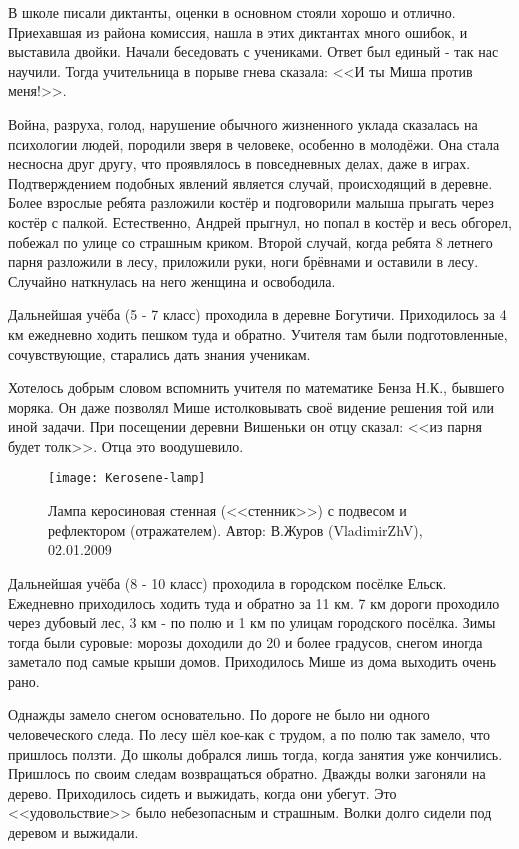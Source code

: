 В школе писали диктанты, оценки в основном стояли хорошо и отлично. Приехавшая из района комиссия, нашла в этих диктантах много ошибок, и выставила двойки. Начали беседовать с учениками. Ответ был единый - так нас научили. Тогда учительница в порыве гнева сказала: <<И ты Миша против меня!>>.

Война, разруха, голод, нарушение обычного жизненного уклада сказалась на психологии людей, породили зверя в человеке, особенно в молодёжи. Она стала несносна друг другу, что проявлялось в повседневных делах, даже в играх. Подтверждением подобных явлений является случай, происходящий в деревне. Более взрослые ребята разложили костёр и подговорили малыша прыгать через костёр с палкой. Естественно, Андрей прыгнул, но попал в костёр и весь обгорел, побежал по улице со страшным криком. Второй случай, когда ребята 8 летнего парня разложили в лесу, приложили руки, ноги брёвнами и оставили в лесу. Случайно наткнулась на него женщина и освободила.

Дальнейшая учёба (5 - 7 класс) проходила в деревне Богутичи. Приходилось за 4 км ежедневно ходить пешком туда и обратно. Учителя там были подготовленные, сочувствующие, старались дать знания ученикам. 

Хотелось добрым словом вспомнить учителя по математике Бенза Н.К., бывшего моряка. Он даже позволял Мише истолковывать своё видение решения той или иной задачи. При посещении деревни Вишеньки он отцу сказал: <<из парня будет толк>>. Отца это воодушевило.

\begin{wrapfigure}{O}{.2\textwidth}
\centering
\texttt{[image: Kerosene-lamp]}
\caption{Лампа керосиновая стенная (<<стенник>>) с подвесом и рефлектором (отражателем). Автор: В.Журов (VladimirZhV), 02.01.2009}
\label{fig:Kerosene-lamp}
\end{wrapfigure}

Дальнейшая учёба (8 - 10 класс) проходила в городском посёлке Ельск. Ежедневно приходилось ходить туда и обратно за 11 км. 7 км дороги проходило через дубовый лес, 3 км - по полю и 1 км по улицам городского посёлка. Зимы тогда были суровые: морозы доходили до 20 и более градусов, снегом иногда заметало под самые крыши домов. Приходилось Мише из дома выходить очень рано. 

Однажды замело снегом основательно. По дороге не было ни одного человеческого следа. По лесу шёл кое-как с трудом, а по полю так замело, что пришлось ползти. До школы добрался лишь тогда, когда занятия уже кончились. Пришлось по своим следам возвращаться обратно. Дважды волки загоняли на дерево. Приходилось сидеть и выжидать, когда они убегут. Это <<удовольствие>> было небезопасным и страшным. Волки долго сидели под деревом и выжидали.

